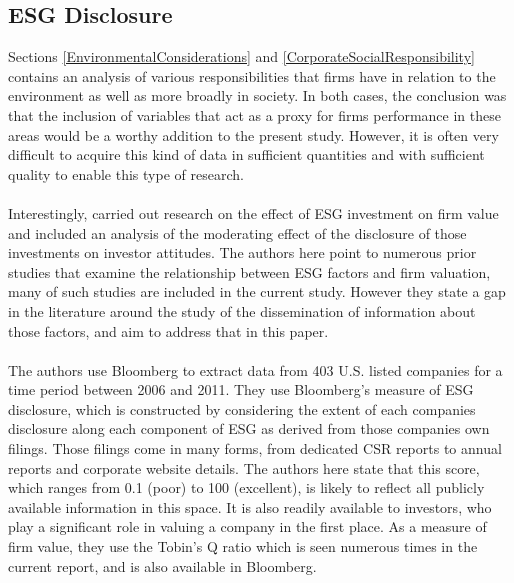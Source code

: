 \subsection {ESG Disclosure} \label{ESGDisclosure}
{Sections \ref{EnvironmentalConsiderations} and \ref{CorporateSocialResponsibility} contains an analysis of various responsibilities that firms have in relation to the environment as well as more broadly in society. In both cases, the conclusion was that the inclusion of variables that act as a proxy for firms performance in these areas would be a worthy addition to the present study. However, it is often very difficult to acquire this kind of data in sufficient quantities and with sufficient quality to enable this type of research. \\\\
Interestingly, \cite{fatemiESG} carried out research on the effect of ESG investment on firm value and included an analysis of the moderating effect of the disclosure of those investments on investor attitudes. The authors here point to numerous prior studies that examine the relationship between ESG factors and firm valuation, many of such studies are included in the current study. However they state a gap in the literature around the study of the dissemination of information about those factors, and aim to address that in this paper.   \\\\
The authors use Bloomberg to extract data from 403 U.S. listed companies for a time period between 2006 and 2011. They use Bloomberg's measure of ESG disclosure, which is constructed by considering the extent of each companies disclosure along each component of ESG as derived from those companies own filings. Those filings come in many forms, from dedicated CSR reports to annual reports and corporate website details. The authors here state that this score, which ranges from 0.1 (poor) to 100 (excellent), is likely to reflect all publicly available information in this space. It is also readily available to investors, who play a significant role in valuing a company in the first place. As a measure of firm value, they use the Tobin's Q ratio which is seen numerous times in the current report, and is also available in Bloomberg. \\\\ 
}
